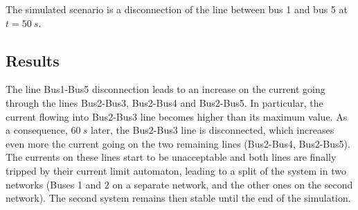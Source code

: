 \documentclass[a4paper, 12pt]{report}
\begin{document}
The simulated scenario is a disconnection of the line between bus 1 and bus 5 at $t = 50 \ s$.

\subsection{Results}

The line Bus1-Bus5 disconnection leads to an increase on the current going through the lines Bus2-Bus3, Bus2-Bus4 and Bus2-Bus5. In particular, the current flowing into Bus2-Bus3 line becomes higher than its maximum value. As a consequence, $60 \ s$ later, the Bus2-Bus3 line is disconnected, which increases even more the current going on the two remaining lines (Bus2-Bus4, Bus2-Bus5). The currents on these lines start to be unacceptable and both lines are finally tripped by their current limit automaton, leading to a split of the system in two networks (Buses 1 and 2 on a separate network, and the other ones on the second network). The second system remains then stable until the end of the simulation.
\end{document}
